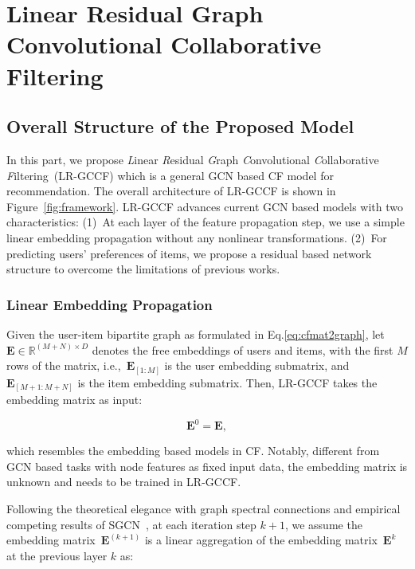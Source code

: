 \documentclass[letterpaper]{article} %
\newcommand{\Mat}[1]{\mathbf{#1}}
\begin{document}
 
\section{Linear Residual Graph Convolutional Collaborative Filtering}


\subsection{Overall Structure of the Proposed Model}
In this part, we propose  \emph{L}inear \emph{R}esidual \emph{G}raph \emph{C}onvolutional \emph{C}ollaborative \emph{F}iltering~(LR-GCCF) which is a general GCN based CF model for recommendation. 
The overall architecture of LR-GCCF is shown in Figure~\ref{fig:framework}. LR-GCCF advances current GCN based models with two characteristics: (1)~At each layer of the feature propagation step, we use a simple linear embedding propagation without any nonlinear transformations. (2)~For predicting users' preferences of items, we propose a residual based network structure to overcome the limitations of previous works.

\subsubsection{Linear Embedding Propagation} 
Given the user-item bipartite graph as formulated in Eq.\eqref{eq:cfmat2graph}, let {\footnotesize $\mathbf{E}\in\mathbb{R}^{(M+N)\times D}$} denotes the free embeddings of users and items, with the first $M$ rows of the matrix, i.e.,~{\footnotesize $\Mat{E}_{[1:M]}$} is the user embedding submatrix, and~{\footnotesize $\Mat{E}_{[M+1:M+N]}$} is the item embedding submatrix. Then, LR-GCCF takes the embedding matrix as input:

\begin{small}
\vspace{-0.3cm}
\begin{equation}\label{eq:lrgcf_ini} 
\Mat{E}^0= \Mat{E},
\end{equation}
\vspace{-0.3cm}
\end{small}

\noindent which resembles the embedding based models in CF. Notably, different from GCN based tasks with node features as fixed input data, the embedding matrix is unknown and needs to be trained in LR-GCCF.

Following the theoretical elegance with graph spectral connections and empirical competing results of SGCN~\cite{ICML2019simplifying}, at each iteration step $k+1$, we assume the embedding matrix~{\footnotesize $\Mat{E}^{(k+1)}$}
is a linear aggregation of the embedding matrix~{\footnotesize $\Mat{E}^k$} at the previous layer $k$ as:
\end{document}
